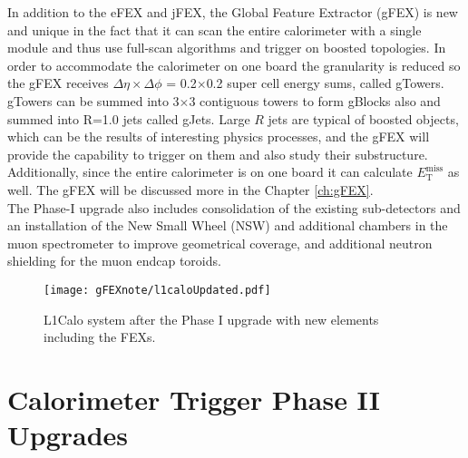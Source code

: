 In addition to the eFEX and jFEX, the Global Feature Extractor (gFEX) is new and unique in the fact that it can scan the entire calorimeter with a single module and thus use full-scan algorithms and trigger on boosted topologies.  In order to accommodate the calorimeter on one board the granularity is reduced so the gFEX receives $\Delta\eta \times \Delta\phi$ = 0.2$\times$0.2 super cell energy sums, called gTowers.  gTowers can be summed into 3$\times$3 contiguous towers to form gBlocks also and summed into R=1.0 jets called gJets.  Large $R$ jets are typical of boosted objects, which can be the results of interesting physics processes, and the gFEX will provide the capability to trigger on them and also study their substructure.  Additionally, since the entire calorimeter is on one board it can calculate $E_{\mathrm{T}}^{\mathrm{miss}}$ as well.  The gFEX will be discussed more in the Chapter \ref{ch:gFEX}.  \\%

%

The Phase-I upgrade also includes consolidation of the existing sub-detectors and an installation of the New Small Wheel (NSW) and additional chambers in the muon spectrometer to improve geometrical coverage, and additional neutron shielding for the muon endcap toroids.  \\

\begin{figure} [h!]
\centering
\texttt{[image: gFEXnote/l1caloUpdated.pdf]} %
\caption{\label{fig:l1calo}{L1Calo system after the Phase I upgrade with new elements including the FEXs\cite{gFEXFDR}.  }}
\end{figure}

\section{Calorimeter Trigger Phase II Upgrades}

